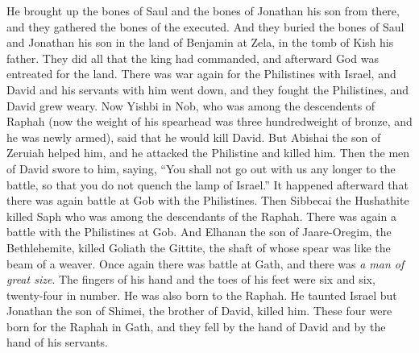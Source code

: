 \begin{biblechapter}
\verse He brought up the bones of Saul and the bones of Jonathan his son from there, and they gathered the bones of the executed.
\verse And they buried the bones of Saul and Jonathan his son in the land of Benjamin at Zela, in the tomb of Kish his father. They did all that the king had commanded, and afterward God was entreated for the land.
 There was war again for the Philistines with Israel, and David and his servants with him went down, and they fought the Philistines, and David grew weary.
\verse Now Yishbi in Nob, who was among the descendents of Raphah (now the weight of his spearhead was three hundredweight of bronze, and he was newly armed), said that he would kill David.
\verse But Abishai the son of Zeruiah helped him, and he attacked the Philistine and killed him. Then the men of David swore to him, saying, “You shall not go out with us any longer to the battle, so that you do not quench the lamp of Israel.”
\verse It happened afterward that there was again battle at Gob with the Philistines. Then Sibbecai the Hushathite killed Saph who was among the descendants of the Raphah.
\verse There was again a battle with the Philistines at Gob. And Elhanan the son of Jaare-Oregim, the Bethlehemite, killed Goliath the Gittite, the shaft of whose spear was like the beam of a weaver.
\verse Once again there was battle at Gath, and there was \textit{a man of great size}. The fingers of his hand and the toes of his feet were six and six, twenty-four in number. He was also born to the Raphah.
\verse He taunted Israel but Jonathan the son of Shimei, the brother of David, killed him.
\verse These four were born for the Raphah in Gath, and they fell by the hand of David and by the hand of his servants.
\end{biblechapter}

